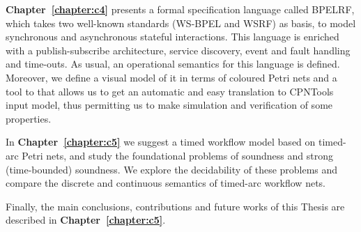 \textbf{Chapter~\ref{chapter:c4}} presents a formal specification language called BPELRF, which takes two well-known standards (WS-BPEL and WSRF) as basis, to model synchronous and asynchronous stateful interactions. This language is enriched with a publish-subscribe architecture, service discovery, event and fault handling and time-outs. As usual, an operational semantics for this language is defined. Moreover, we define a visual model of it in terms of coloured Petri nets and a tool to that allows us to get an automatic and easy translation to CPNTools input model, thus permitting us to make simulation and verification of some properties.

In \textbf{Chapter~\ref{chapter:c5}} we suggest a timed workflow model based on timed-arc Petri nets, and study
the foundational problems of soundness and strong (time-bounded) soundness.
We explore the decidability of these problems
and compare the discrete and continuous semantics of timed-arc
workflow nets. 

Finally, the main conclusions, contributions and future works of this Thesis are described in \textbf{Chapter~\ref{chapter:c5}}.